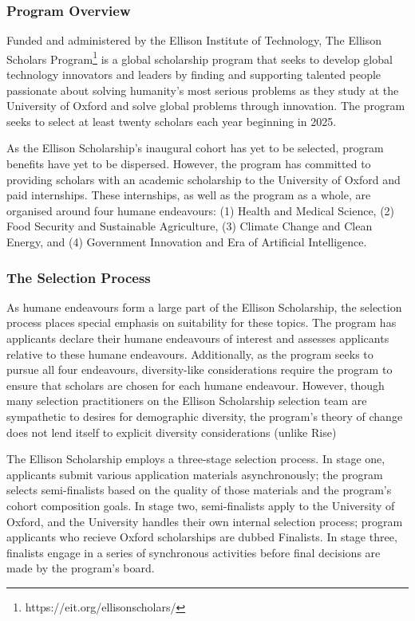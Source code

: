 \subsubsection{Program Overview}
Funded and administered by the Ellison Institute of Technology, The Ellison Scholars Program\footnote{https://eit.org/ellisonscholars/} is a global scholarship program that seeks to develop global technology innovators and leaders by finding and supporting talented people passionate about solving humanity’s most serious problems as they study at the University of Oxford and solve global problems through innovation. The program seeks to select at least twenty scholars each year beginning in 2025.

As the Ellison Scholarship's inaugural cohort has yet to be selected, program benefits have yet to be dispersed. However, the program has committed to providing scholars with an academic scholarship to the University of Oxford and paid internships. These internships, as well as the program as a whole, are organised around four humane endeavours: (1) Health and Medical Science, (2) Food Security and Sustainable Agriculture, (3) Climate Change and Clean Energy, and (4) Government Innovation and Era of Artificial Intelligence.

\subsubsection{The Selection Process}
As humane endeavours form a large part of the Ellison Scholarship, the selection process places special emphasis on suitability for these topics. The program has applicants declare their humane endeavours of interest and assesses applicants relative to these humane endeavours. Additionally, as the program seeks to pursue all four endeavours, diversity-like considerations require the program to ensure that scholars are chosen for each humane endeavour. However, though many selection practitioners on the Ellison Scholarship selection team are sympathetic to desires for demographic diversity, the program's theory of change does not lend itself to explicit diversity considerations (unlike Rise)

The Ellison Scholarship employs a three-stage selection process. In stage one, applicants submit various application materials asynchronously; the program selects semi-finalists based on the quality of those materials and the program's cohort composition goals. In stage two, semi-finalists apply to the University of Oxford, and the University handles their own internal selection process; program applicants who recieve Oxford scholarships are dubbed Finalists. In stage three, finalists engage in a series of synchronous activities before final decisions are made by the program's board. 

